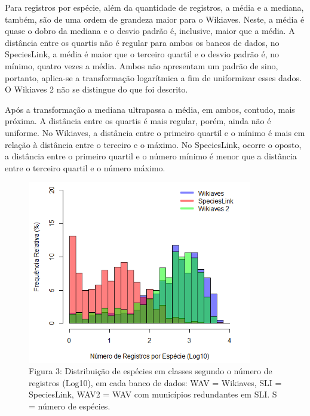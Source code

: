 \begin{resposta}
Para registros por espécie, além da quantidade de registros, a média e a mediana, também, são de uma ordem de grandeza maior para o Wikiaves. Neste, a média é quase o dobro da mediana e o desvio padrão é, inclusive, maior que a média. A distância entre os quartis não é regular para ambos os bancos de dados, no SpeciesLink, a média é maior que o terceiro quartil e o desvio padrão é, no mínimo, quatro vezes a média. Ambos não apresentam um padrão de sino, portanto, aplica-se a transformação logarítmica a fim de uniformizar esses dados. O Wikiaves 2 não se distingue do que foi descrito.

Após a transformação a mediana ultrapassa a média, em ambos, contudo, mais próxima. A distância entre os quartis é mais regular, porém, ainda não é uniforme. No Wikiaves, a distância entre o primeiro quartil e o mínimo é mais em relação à distância entre o terceiro e o máximo. No SpeciesLink, ocorre o oposto, a distância entre o primeiro quartil e o número mínimo é menor que a distância entre o terceiro quartil e o número máximo.
 
\end{resposta}

\begin{figure}[h!]
\centering
\includegraphics[height = 8cm]{Imagens/H03.png}
\\{\scriptsize Figura 3: Distribuição de espécies em classes segundo o número de registros (Log10), em cada banco de dados: WAV = Wikiaves, SLI = SpeciesLink, WAV2 = WAV com municípios redundantes em SLI. S = número de espécies.}
\end{figure}

\newpage